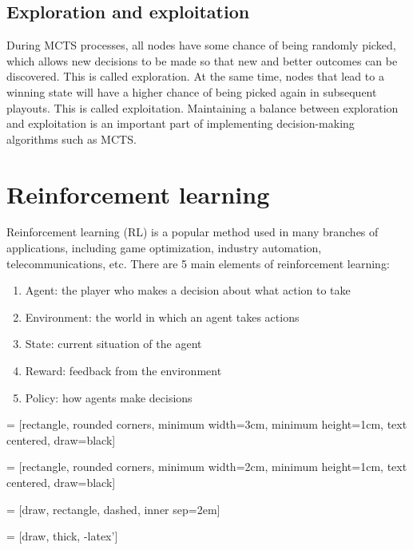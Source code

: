 \subsection{Exploration and exploitation}
During MCTS processes, all nodes have some chance of being randomly picked, which allows new decisions to be made so that new and better outcomes can be discovered. This is called exploration. At the same time, nodes that lead to a winning state will have a higher chance of being picked again in subsequent \Gls{playout}s. This is called exploitation. Maintaining a balance between exploration and exploitation is an important part of implementing decision-making algorithms such as MCTS.


\section{Reinforcement learning} %
Reinforcement learning (RL) is a popular method used in many branches of applications, including game optimization, industry automation, telecommunications, etc. There are 5 main elements of reinforcement learning:

\begin{enumerate}
  \item Agent: the player who makes a decision about what action to take
  \item Environment: the world in which an agent takes actions
  \item State: current situation of the agent
  \item Reward: feedback from the environment
  \item Policy: how agents make decisions
\end{enumerate}

 = [rectangle, rounded corners, 
minimum width=3cm, 
minimum height=1cm,
text centered, 
draw=black]

 = [rectangle, rounded corners, 
minimum width=2cm, 
minimum height=1cm,
text centered, 
draw=black]

 = [draw, rectangle, dashed, inner sep=2em]

 = [draw, thick, -latex']

